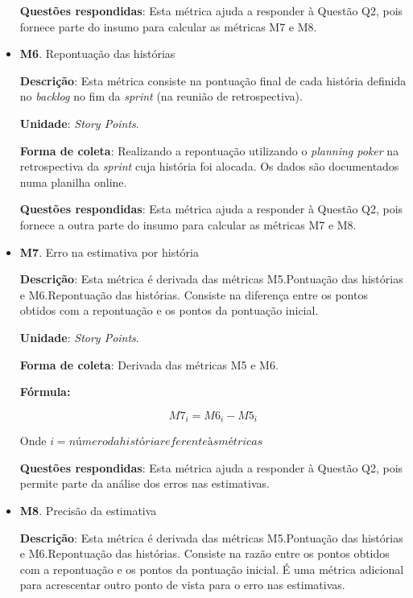 \begin{itemize}
	   \subitem \textbf{Questões respondidas}: Esta métrica ajuda a responder à Questão Q2, pois fornece parte do insumo para calcular 
		    as métricas M7 e M8. 
		    
	 \item \textbf{M6}. Repontuação das histórias
	   
	   \subitem \textbf{Descrição}: Esta métrica consiste na pontuação final de cada história definida no \textit{backlog} no fim
		    da \textit{sprint} (na reunião de retrospectiva).
	   
	   \subitem \textbf{Unidade}: \textit{Story Points}.
	   
	   \subitem \textbf{Forma de coleta}: Realizando a repontuação utilizando o \textit{planning poker} na retrospectiva da \textit{sprint}
		    cuja história foi alocada. Os dados são documentados numa planilha online.
	   
	   \subitem \textbf{Questões respondidas}: Esta métrica ajuda a responder à Questão Q2, pois fornece a outra parte do insumo para calcular 
		    as métricas M7 e M8.
		    
	 \item \textbf{M7}. Erro na estimativa por história
	 
	   \subitem \textbf{Descrição}: Esta métrica é derivada das métricas M5.Pontuação das histórias e M6.Repontuação das histórias.
		    Consiste na diferença entre os pontos obtidos com a repontuação e os pontos da pontuação inicial.
	   
	   \subitem \textbf{Unidade}: \textit{Story Points}.
	   
	   \subitem \textbf{Forma de coleta}: Derivada das métricas M5 e M6.
	   
	      \subsubitem \textbf{Fórmula:} 
	      
		$$ M7_i = M6_i - M5_i $$
		
	      \subsubitem Onde $i = número da história referente às métricas$
	   
	   \subitem \textbf{Questões respondidas}: Esta métrica ajuda a responder à Questão Q2, pois permite parte da análise 
		    dos erros nas estimativas.
	 
	 \item \textbf{M8}. Precisão da estimativa
	 
	   \subitem \textbf{Descrição}: Esta métrica é derivada das métricas M5.Pontuação das histórias e M6.Repontuação das histórias.
		    Consiste na razão entre os pontos obtidos com a repontuação e os pontos da pontuação inicial. É uma métrica adicional
		    para acrescentar outro ponto de vista para o erro nas estimativas.
	   

\end{itemize}
